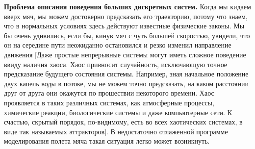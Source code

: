 \documentclass[a4paper,12pt]{article}
\begin{document}
\begin{small}
\textbf{Проблема описания поведения больших дискретных систем.} Когда мы кидаем вверх мяч, мы можем достоверно предсказать его траекторию, потому что знаем, что в нормальных условиях здесь действуют известные физические законы. Мы бы очень удивились, если бы, кинув мяч с чуть большей скоростью, увидели, что он на середине пути неожиданно остановился и резко изменил направление движения [Даже простые непрерывные системы могут иметь сложное поведение ввиду наличия хаоса. Хаос привносит случайность, исключающую точное предсказание будущего состояния системы. Например, зная начальное положение двух капель воды в потоке, мы не можем точно предсказать, на каком расстоянии друг от друга они окажутся по прошествии некоторого времени. Хаос проявляется в таких различных системах, как атмосферные процессы, химические реакции, биологические системы и даже компьютерные сети. К счастью, скрытый порядок, по-видимому, есть во всех хаотических системах, в виде так называемых аттракторов]. В недостаточно отлаженной программе моделирования полета мяча такая ситуация легко может возникнуть. \par
\end{small} 
\end{document}

